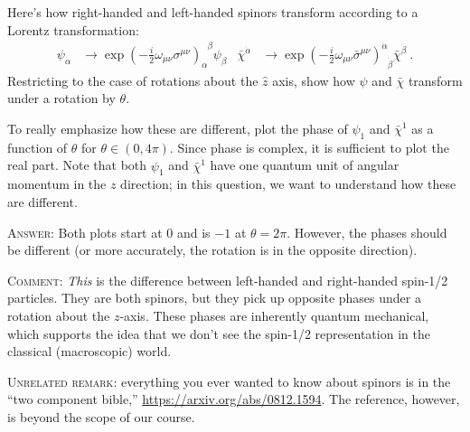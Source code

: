 \documentclass[12pt]{article}
\begin{document}
Here's how right-handed and left-handed spinors transform according to a Lorentz transformation:
\begin{align}
	\psi_\alpha &\to \exp\left(
		-\frac i2 \omega_{\mu\nu} \sigma^{\mu\nu}\right)_\alpha^{\phantom\alpha \beta} \psi_\beta
	&
	\bar\chi^{\dot\alpha}
	&\to \exp\left(-\frac i2 \omega_{\mu\nu} \bar\sigma^{\mu\nu}\right)^{\dot\alpha}_{\phantom\alpha \dot\beta} \bar\chi^{\dot\beta} \ .
\end{align}
Restricting to the case of rotations about the $\hat z$ axis, show how $\psi$ and $\bar\chi$ transform under a rotation by $\theta$. 

To really emphasize how these are different, plot the phase of $\psi_1$ and $\bar\chi^{\dot 1}$ as a function of $\theta$ for $\theta \in (0, 4\pi)$. Since phase is complex, it is sufficient to plot the real part. Note that both $\psi_1$ and $\bar\chi^{\dot 1}$ have one quantum unit of angular momentum in the $z$ direction; in this question, we want to understand how these are different.

\textsc{Answer}: Both plots start at 0 and is $-1$ at $\theta = 2\pi$. However, the phases should be different (or more accurately, the rotation is in the opposite direction). 

\textsc{Comment}: \emph{This} is the difference between left-handed and right-handed spin-1/2 particles. They are both spinors, but they pick up opposite phases under a rotation about the $z$-axis. These phases are inherently quantum mechanical, which supports the idea that we don't see the spin-1/2 representation in the classical (macroscopic) world. 

\textsc{Unrelated remark}: everything you ever wanted to know about spinors is in the ``two component bible,'' \url{https://arxiv.org/abs/0812.1594}. The reference, however, is beyond the scope of our course.

\end{document}

